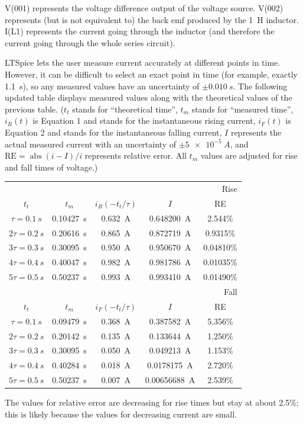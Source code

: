 \documentclass{article}
\begin{document}
V(001) represents the voltage difference output of the
voltage source. V(002) represents (but is not equivalent to)
the back emf produced by the \SI{1}{H} inductor. I(L1) represents
the current going through the inductor (and therefore
the current going through the whole series
circuit).

LTSpice lets the user measure
current accurately at different points in time. However, it
can be difficult to select an exact point in time (for example,
exactly \SI{1.1}{s}), so any measured values have an uncertainty
of \(\pm \SI{0.010}{s}\). The following updated table displays
measured values along with the theoretical values of the
previous table. (\(t_t\) stands for ``theoretical
time'', \(t_m\) stands for ``measured time'', 
\(i_R(t)\) is Equation 1 and stands for the instantaneous
rising current, \(i_F(t)\) is Equation 2 and stands for
the instantaneous falling current,
\(I\) represents the actual measured current with an
uncertainty of \(\pm \SI{5e-5}{A}\),
and \(\text{RE} =\operatorname{abs}(i - I)/i \)
represents relative error. All \(t_m\) values are
adjusted for rise and fall times of voltage.)

\begin{tabular}{c | c || c | c || c}
    \multicolumn{5}{r}{Rise}\\
    \(t_t\) & \(t_m\) &  \( i_R(-t_t / \tau) \) & \(I\) & RE \\ \hline
    \( \tau = \SI{0.1}{s}\) & \SI{0.10427}{s} & \SI{0.632}{A} & \SI{0.648200}{A} & \num{2.544}\% \\ \hline
    \(2\tau = \SI{0.2}{s}\) & \SI{0.20616}{s} & \SI{0.865}{A} & \SI{0.872719}{A} & \num{0.9315}\% \\ \hline
    \(3\tau = \SI{0.3}{s}\) & \SI{0.30095}{s} & \SI{0.950}{A} & \SI{0.950670}{A} & \num{0.04810}\% \\ \hline
    \(4\tau = \SI{0.4}{s}\) & \SI{0.40047}{s} & \SI{0.982}{A} & \SI{0.981786}{A} & \num{0.01035}\% \\ \hline
    \(5\tau = \SI{0.5}{s}\) & \SI{0.50237}{s} & \SI{0.993}{A} & \SI{0.993410}{A} & \num{0.01490}\% \\ \hline
    \multicolumn{5}{r}{Fall}\\
    \(t_t\) & \(t_m\) &  \( i_F(-t_t / \tau) \) & \(I\) & RE \\ \hline
    \( \tau = \SI{0.1}{s}\) & \SI{0.09479}{s} & \SI{0.368}{A} & \SI{0.387582}{A} & \num{5.356}\% \\ \hline
    \(2\tau = \SI{0.2}{s}\) & \SI{0.20142}{s} & \SI{0.135}{A} & \SI{0.133644}{A} & \num{1.250}\% \\ \hline
    \(3\tau = \SI{0.3}{s}\) & \SI{0.30095}{s} & \SI{0.050}{A} & \SI{0.049213}{A} & \num{1.153}\% \\ \hline
    \(4\tau = \SI{0.4}{s}\) & \SI{0.40284}{s} & \SI{0.018}{A} &\SI{0.0178175}{A} & \num{2.720}\% \\ \hline
    \(5\tau = \SI{0.5}{s}\) & \SI{0.50237}{s} & \SI{0.007}{A} &\SI{0.00656688}{A}& \num{2.539}\% \\
\end{tabular}

The values for relative error are decreasing for rise times
but stay at about \num{2.5}\%; this is likely because the
values for decreasing current are small.
\end{document}
